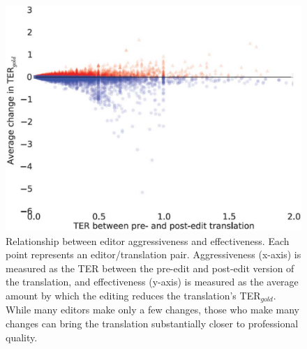 \documentclass[11pt]{article}
\begin{document}
\begin{figure}[h]
  \centering
  \includegraphics[width=\linewidth]{translation-editor-scatter}
  \caption{Relationship between editor aggressiveness and effectiveness. Each point represents an editor/translation pair. Aggressiveness (x-axis) is measured as the TER between the pre-edit and post-edit version of the translation, and effectiveness (y-axis) is measured as the average amount by which the editing reduces the translation's TER$_{gold}$. While many editors make only a few changes, those who make many changes can bring the translation substantially closer to professional quality.}
    \label{editor-scatter}
\end{figure}
\end{document}
